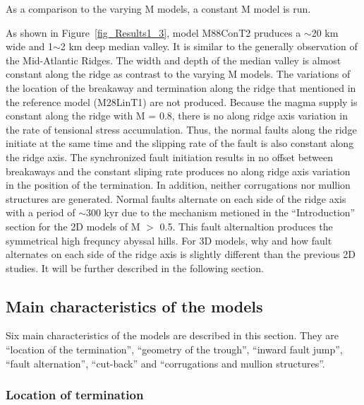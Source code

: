 As a comparison to the varying M models, a constant M model is run. 

As shown in Figure~\hyperref[fig_Results1_3]{\ref{fig_Results1_3}}, model M88ConT2 pruduces a $\sim$20 km wide and 1$\sim$2 km deep median valley. It is similar to the generally observation of the Mid-Atlantic Ridges. The width and depth of the median valley is almost constant along the ridge as contrast to the varying M models. The variations of the location of the breakaway and termination along the ridge that mentioned in the reference model (M28LinT1) are not produced. Because the magma supply is constant along the ridge with M = 0.8, there is no along ridge axis variation in the rate of tensional stress accumulation. Thus, the normal faults along the ridge initiate at the same time and the slipping rate of the fault is also constant along the ridge axis. The synchronized fault initiation results in no offset between breakaways and the constant sliping rate produces no along ridge axis variation in the position of the termination. In addition, neither corrugations nor mullion structures are generated. Normal faults alternate on each side of the ridge axis with a period of $\sim$300 kyr due to the mechanism metioned in the ``Introduction'' section for the 2D models of M $>$ 0.5. This fault alternaltion produces the symmetrical high frequncy abyssal hills. For 3D models, why and how fault alternates on each side of the ridge axis is slightly different than the previous 2D studies. It will be further described in the following section. 

\subsection{Main characteristics of the models}
Six main characteristics of the models are described in this section. They are ``location of the termination'', ``geometry of the trough'', ``inward fault jump'', ``fault alternation'', ``cut-back'' and ``corrugations and mullion structures''.
\subsubsection{Location of termination}

